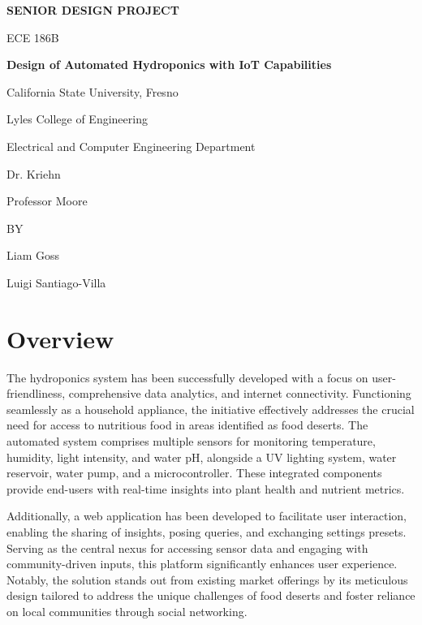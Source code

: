 \documentclass[12pt]{article}
\begin{document}
\begin{titlepage}
    \centering
    {\Large\bfseries SENIOR DESIGN PROJECT\par}
    \vspace{1.5cm}
    {\Large ECE 186B\par}
    \vspace{1.5cm}
    {\Large\bfseries Design of Automated Hydroponics with IoT Capabilities\par}
    \vspace{3cm}
    {\large California State University, Fresno\par}
    {\large Lyles College of Engineering\par}
    {\large Electrical and Computer Engineering Department\par}
    \vspace{2cm}
    {\large Dr. Kriehn\par}
    {\large Professor Moore\par}
    \vspace{2cm}
    {\large BY\par}
    \vspace{1cm}
    {\large Liam Goss\par}
    {\large Luigi Santiago-Villa\par}
\end{titlepage}
\section*{Overview}
The hydroponics system has been successfully developed with a focus on user-friendliness, comprehensive data analytics, and internet connectivity. Functioning seamlessly as a household appliance, the initiative effectively addresses the crucial need for access to nutritious food in areas identified as food deserts. The automated system comprises multiple sensors for monitoring temperature, humidity, light intensity, and water pH, alongside a UV lighting system, water reservoir, water pump, and a microcontroller. These integrated components provide end-users with real-time insights into plant health and nutrient metrics.

Additionally, a web application has been developed to facilitate user interaction, enabling the sharing of insights, posing queries, and exchanging settings presets. Serving as the central nexus for accessing sensor data and engaging with community-driven inputs, this platform significantly enhances user experience. Notably, the solution stands out from existing market offerings by its meticulous design tailored to address the unique challenges of food deserts and foster reliance on local communities through social networking.
\end{document}
